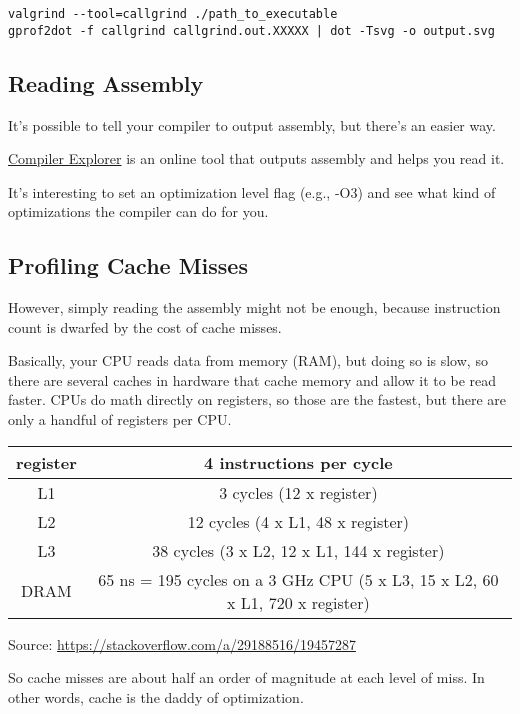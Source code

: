 \documentclass[letterpaper,11pt]{article}
\begin{document}
\begin{verbatim}
valgrind --tool=callgrind ./path_to_executable
gprof2dot -f callgrind callgrind.out.XXXXX | dot -Tsvg -o output.svg
\end{verbatim}

\subsection{Reading Assembly}

It's possible to tell your compiler to output assembly, but there's an easier way.

\href{https://godbolt.org/}{Compiler Explorer} is an online tool that outputs assembly and helps you read it.

It's interesting to set an optimization level flag (e.g., -O3) and see what kind of optimizations the compiler can do 
for you.


\subsection{Profiling Cache Misses}

However, simply reading the assembly might not be enough, because instruction count is dwarfed by the cost of cache misses. 

Basically, your CPU reads data from memory (RAM), but doing so is slow, so there are several caches in hardware
that cache memory and allow it to be read faster. CPUs do math directly on registers, so those 
are the fastest, but there are only a handful of registers per CPU.

\begin{center}
\begin{tabular}{ |c|c| }
\hline
register & 4 instructions per cycle \\ 
\hline
L1       & 3 cycles (12 x register) \\
\hline
L2       & 12 cycles (4 x L1, 48 x register) \\
\hline
L3       & 38 cycles (3 x L2, 12 x L1, 144 x register) \\
\hline
DRAM     & 65 ns = 195 cycles on a 3 GHz CPU (5 x L3, 15 x L2, 60 x L1, 720 x register) \\
\hline
\end{tabular}
\end{center}
Source: \url{https://stackoverflow.com/a/29188516/19457287}

So cache misses are about half an order of magnitude at each level of miss. In other words, cache is the 
daddy of optimization.
\end{document}
